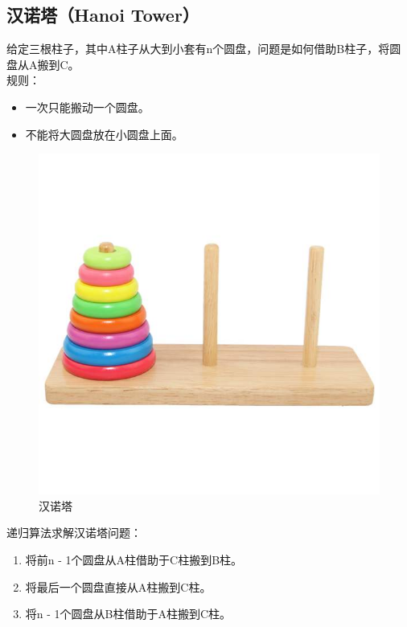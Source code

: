 \subsection{汉诺塔（Hanoi Tower）}

给定三根柱子，其中A柱子从大到小套有n个圆盘，问题是如何借助B柱子，将圆盘从A搬到C。 \\

规则：

\begin{itemize}
    \item 一次只能搬动一个圆盘。
    \item 不能将大圆盘放在小圆盘上面。
\end{itemize}

\begin{figure}[H]
    \centering
    \includegraphics[scale=0.4]{img/C11/11-3/1.png}
    \caption{汉诺塔}
\end{figure}

递归算法求解汉诺塔问题：

\begin{enumerate}
    \item 将前n - 1个圆盘从A柱借助于C柱搬到B柱。
    \item 将最后一个圆盘直接从A柱搬到C柱。
    \item 将n - 1个圆盘从B柱借助于A柱搬到C柱。
\end{enumerate}

